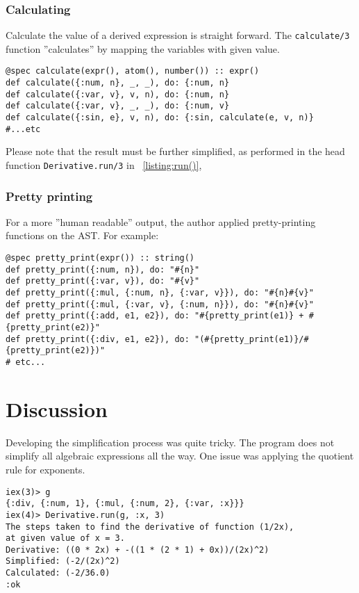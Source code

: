 \documentclass[a4paper,11pt]{article}
\begin{document}
\subsubsection*{Calculating}
Calculate the value of a derived expression is straight forward.
The \texttt{calculate/3} function ''calculates'' by mapping
the variables with given value.
\begin{verbatim}
@spec calculate(expr(), atom(), number()) :: expr()
def calculate({:num, n}, _, _), do: {:num, n}
def calculate({:var, v}, v, n), do: {:num, n}
def calculate({:var, v}, _, _), do: {:num, v}
def calculate({:sin, e}, v, n), do: {:sin, calculate(e, v, n)}
#...etc
\end{verbatim}
Please note that the result must be further simplified, as performed in the head function
\texttt{Derivative.run/3} in
~\ref{listing:run()},

\subsubsection*{Pretty printing}
For a more ''human readable'' output, the author applied pretty-printing functions
on the AST. For example:
\begin{verbatim}
@spec pretty_print(expr()) :: string()
def pretty_print({:num, n}), do: "#{n}"
def pretty_print({:var, v}), do: "#{v}"
def pretty_print({:mul, {:num, n}, {:var, v}}), do: "#{n}#{v}"
def pretty_print({:mul, {:var, v}, {:num, n}}), do: "#{n}#{v}"
def pretty_print({:add, e1, e2}), do: "#{pretty_print(e1)} + #{pretty_print(e2)}"
def pretty_print({:div, e1, e2}), do: "(#{pretty_print(e1)}/#{pretty_print(e2)})"
# etc...
\end{verbatim}

\section*{Discussion}
\label{sec:discussion}
Developing the simplification process was quite tricky.
The program does not simplify all algebraic expressions all the way.
One issue was applying the quotient rule for exponents.
\begin{verbatim}
iex(3)> g
{:div, {:num, 1}, {:mul, {:num, 2}, {:var, :x}}}
iex(4)> Derivative.run(g, :x, 3)
The steps taken to find the derivative of function (1/2x),
at given value of x = 3.
Derivative: ((0 * 2x) + -((1 * (2 * 1) + 0x))/(2x)^2)
Simplified: (-2/(2x)^2)
Calculated: (-2/36.0)
:ok
\end{verbatim}
\end{document}

